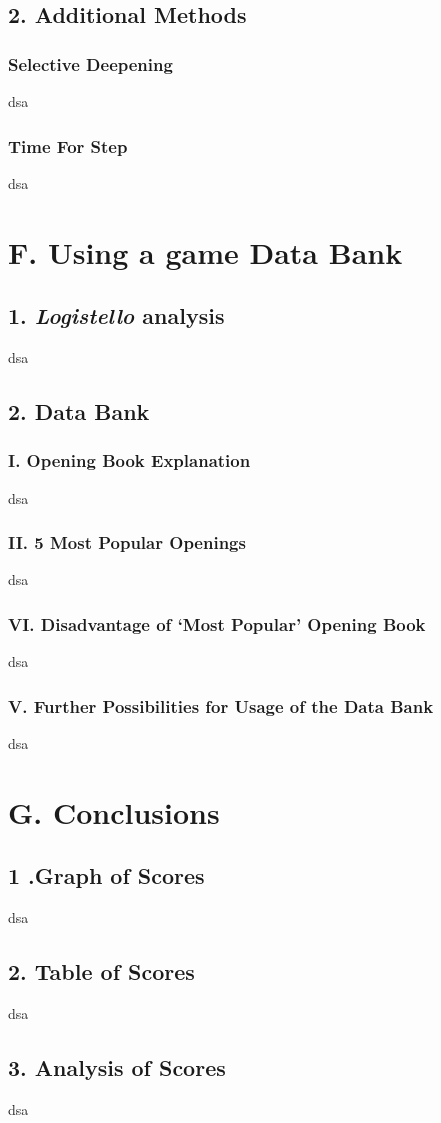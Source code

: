\documentclass{article}
\begin{document}
\subsection*{2. Additional Methods}
\subsubsection*{Selective Deepening}
dsa

\subsubsection*{Time For Step}
dsa

\section*{F. Using a game Data Bank}
\subsection*{1. \emph{Logistello} analysis}
dsa

\subsection*{2. Data Bank}
\subsubsection*{I. Opening Book Explanation}
dsa

\subsubsection*{II. 5 Most Popular Openings}
dsa

\subsubsection*{VI. Disadvantage of `Most Popular' Opening Book}
dsa

\subsubsection*{V. Further Possibilities for Usage of the Data Bank}
dsa

\section*{G. Conclusions}
\subsection*{1 .Graph of Scores}
dsa

\subsection*{2. Table of Scores}
dsa

\subsection*{3. Analysis of Scores}
dsa
\end{document}
